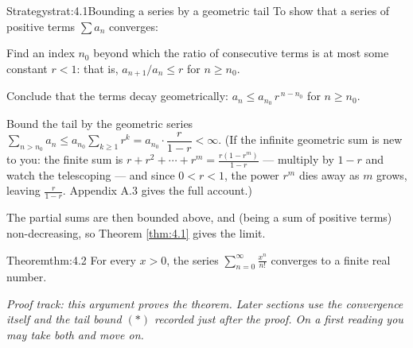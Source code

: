 \documentclass[a4paper,12pt,oneside]{memoir}
\begin{document}
\begin{envstrategy}{Strategy}{strat:4.1}{Bounding a series by a geometric tail}
To show that a series of positive terms \(\sum a_{n}\) converges:

\begin{steps}
  \item Find an index \(n_{0}\) beyond which the ratio of consecutive terms is at most some constant \(r < 1\): that is, \(a_{n + 1}/a_{n} \le r\) for \(n \ge n_{0}\).
  \item Conclude that the terms decay geometrically: \(a_{n} \le a_{n_{0}} \, r^{\,n - n_{0}}\) for \(n \ge n_{0}\).
  \item Bound the tail by the geometric series \(\sum_{n > n_{0}} a_{n} \le a_{n_{0}} \sum_{k \ge 1} r^{k} = a_{n_{0}} \cdot \dfrac{r}{1 - r} < \infty\). (If the infinite geometric sum is new to you: the finite sum is \(r + r^{2} + \cdots + r^{m} = \frac{r(1 - r^{m})}{1 - r}\) — multiply by \(1 - r\) and watch the telescoping — and since \(0 < r < 1\), the power \(r^{m}\) dies away as \(m\) grows, leaving \(\frac{r}{1 - r}\). Appendix A.3 gives the full account.)
  \item The partial sums are then bounded above, and (being a sum of positive terms) non-decreasing, so Theorem \ref{thm:4.1} gives the limit.
\end{steps}
\end{envstrategy}
\begin{envtheorem}{Theorem}{thm:4.2}{}
For every \(x > 0\), the series \(\displaystyle\sum_{n = 0}^{\infty} \frac{x^{n}}{n!}\) converges to a finite real number.
\end{envtheorem}
\emph{Proof track: this argument proves the theorem. Later sections use the convergence itself and the tail bound \((*)\) recorded just after the proof. On a first reading you may take both and move on.}
\end{document}
